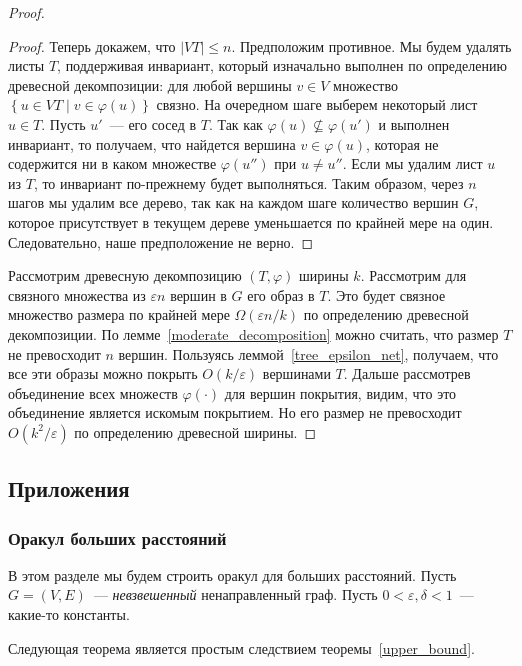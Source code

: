 \documentclass[12pt]{article}
\newcommand{\eps}{\varepsilon}
\newcommand{\set}[1]{\left\{#1\right\}}
\newcommand{\abs}[1]{\left|#1\right|}
\newcommand{\setst}[2]{\set{#1 \mid #2}}
\begin{document}
\begin{proof}
\begin{proof}
            Теперь докажем, что $\abs{VT} \leq n$. Предположим противное.
            Мы будем удалять листы $T$, поддерживая инвариант, который изначально выполнен по определению древесной
            декомпозиции: для любой вершины $v \in V$ множество $\setst{u \in VT}{v \in \varphi(u)}$ связно.
            На очередном шаге выберем некоторый лист $u \in T$. Пусть $u'$~--- его сосед в $T$. Так как 
            $\varphi(u) \not \subseteq \varphi(u')$ и выполнен инвариант, то получаем, что найдется вершина 
            $v \in \varphi(u)$, которая не содержится ни в каком множестве $\varphi(u'')$ при $u \ne u''$.
            Если мы удалим лист $u$ из $T$, то инвариант по-прежнему будет выполняться.
            Таким образом, через $n$ шагов мы удалим все дерево, так как на каждом шаге количество вершин
            $G$, которое присутствует в текущем дереве уменьшается по крайней мере на один.
            Следовательно, наше предположение не верно.
        \end{proof}

        Рассмотрим древесную декомпозицию $(T, \varphi)$ ширины $k$. Рассмотрим для связного множества из $\eps n$
        вершин в $G$ его образ в $T$.
        Это будет связное множество размера по крайней мере $\Omega(\eps n / k)$ по определению древесной декомпозиции.
        По лемме~\ref{moderate_decomposition} можно считать, что размер $T$ не превосходит $n$ вершин. Пользуясь
        леммой~\ref{tree_epsilon_net}, получаем, что все эти образы можно покрыть $O(k / \eps)$ вершинами $T$.
        Дальше рассмотрев объединение всех множеств $\varphi(\cdot)$ для вершин покрытия, видим, что это объединение является
        искомым покрытием. Но его размер не превосходит $O(k^2 / \eps)$ по определению древесной ширины.
    \end{proof}
    \subsection{Приложения}
    \label{subsection_applications}
    \subsubsection{Оракул больших расстояний}
    \label{subsubsection_distance_oracle}
    В этом разделе мы будем строить оракул для больших расстояний.
    Пусть $G = (V, E)$~--- \emph{невзвешенный} ненаправленный граф.
    Пусть $0 < \eps, \delta < 1$~--- какие-то константы.

    Следующая теорема является простым следствием теоремы~\ref{upper_bound}.
\end{document}
